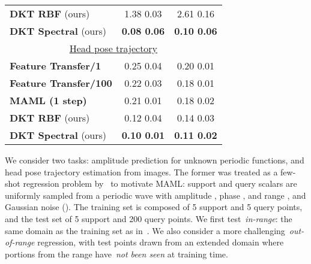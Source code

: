 \documentclass{article}
\begin{document}
\begin{wraptable}{R}{0.45\textwidth}
\begin{adjustbox}{width=0.45\columnwidth,center}
\begin{tabular}{lcc}
\small{\textbf{DKT  RBF}} (ours) & \small{1.38  0.03} & \small{2.61  0.16}\\
\small{\textbf{DKT  Spectral}} (ours) & \small{\textbf{0.08  0.06}} & \small{\textbf{0.10  0.06}}\\
\hline
\multicolumn{3}{c}{\small{\underline{Head pose trajectory}}}\\
\small{\textbf{Feature Transfer/1}}     & \small{0.25  0.04}   & \small{0.20  0.01}\\
\small{\textbf{Feature Transfer/100}}   & \small{0.22  0.03}   & \small{0.18  0.01}\\
\small{\textbf{MAML (1 step)}}           & \small{0.21  0.01}         & \small{0.18  0.02}\\
\small{\textbf{DKT  RBF}} (ours) & \small{0.12  0.04}  & \small{0.14  0.03}\\
\small{\textbf{DKT  Spectral}} (ours) & \small{\textbf{0.10  0.01}}   & \small{\textbf{0.11  0.02}}\\
\hline
\end{tabular}
\end{adjustbox}
\label{tab_regression_mse}
\end{wraptable}

We consider two tasks: amplitude prediction for unknown periodic functions, and head pose trajectory estimation from images. The former was treated as a few-shot regression problem by~\citet{finn2017model} to motivate MAML: support and query scalars are uniformly sampled from a periodic wave with amplitude , phase , and range , and Gaussian noise (). The training set is composed of 5 support and 5 query points, and the test set of 5 support and 200 query points. We first test~\emph{in-range}: the same domain as the training set as in~\citet{finn2017model}. We also consider a more challenging~\emph{out-of-range} regression, with test points drawn from an extended domain  where portions from the range  have~\emph{not been seen} at training time.
\end{document}
